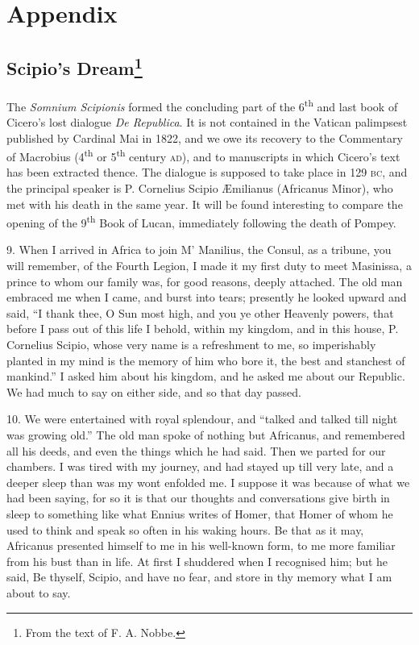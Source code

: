 \documentclass[a4paper, 11pt, oneside, polutonikogreek, english]{article}
\begin{document}
\section{Appendix}

\subsection[Scipio's Dream]{Scipio's Dream\footnote{From the text of F. A. Nobbe.}}
\paragraph{}
The \emph{Somnium Scipionis} formed the concluding part of the 6\textsuperscript{th} and last book of Cicero's lost dialogue \emph{De Republica}. It is not contained in the Vatican palimpsest published by Cardinal Mai in 1822, and we owe its recovery to the Commentary of Macrobius (4\textsuperscript{th} or 5\textsuperscript{th} century \textsc{ad}), and to manuscripts in which Cicero's text has been extracted thence. The dialogue is supposed to take place in 129 \textsc{bc}, and the principal speaker is P. Cornelius Scipio Æmilianus (Africanus Minor), who met with his death in the same year. It will be found interesting to compare the opening of the 9\textsuperscript{th} Book of Lucan, immediately following the death of Pompey.

\bigskip
\centerline{\EightStarTaper}
\centerline{\EightStarTaper\EightStarTaper}
\bigskip

9. When I arrived in Africa to join M' Manilius, the Consul, as a tribune, you will remember, of the Fourth Legion, I made it my first duty to meet Masinissa, a prince to whom our family was, for good reasons, deeply attached. The old man embraced me when I came, and burst into tears; presently he looked upward and said, ``I thank thee, O Sun most high, and you ye other Heavenly powers, that before I pass out of this life I behold, within my kingdom, and in this house, P. Cornelius Scipio, whose very name is a refreshment to me, so imperishably planted in my mind is the memory of him who bore it, the best and stanchest of mankind.'' I asked him about his kingdom, and he asked me about our Republic. We had much to say on either side, and so that day passed.

10. We were entertained with royal splendour, and ``talked and talked till night was growing old.'' The old man spoke of nothing but Africanus, and remembered all his deeds, and even the things which he had said. Then we parted for our chambers. I was tired with my journey, and had stayed up till very late, and a deeper sleep than was my wont enfolded me. I suppose it was because of what we had been saying, for so it is that our thoughts and conversations give birth in sleep to something like what Ennius writes of Homer, that Homer of whom he used to think and speak so often in his waking hours. Be that as it may, Africanus presented himself to me in his well-known form, to me more familiar from his bust than in life. At first I shuddered when I recognised him; but he said, Be thyself, Scipio, and have no fear, and store in thy memory what I am about to say.
\end{document}
